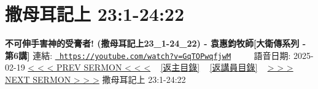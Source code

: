 \documentclass{book}
\begin{document}
\section{撒母耳記上 23:1-24:22}
\label{sec:GqTOPwqfjwM}
\textbf{不可伸手害神的受膏者! (撒母耳記上23\_1-24\_22) - 袁惠鈞牧師[大衛傳系列 - 第6講]}
\newline
\newline
連結: \href{https://youtube.com/watch?v=GqTOPwqfjwM}{\texttt{ https://youtube.com/watch?v=GqTOPwqfjwM}} ~~~~ 語音日期: 2025-02-19 
\newline
\newline
\hyperref[sec:WCt7vYrgwVY]{< < < PREV SERMON < < <}
~
\hyperlink{toc}{[返主目錄]}
~
\hyperref[ch:preacher10]{[返講員目錄]}
~
\hyperref[sec:86NlAlqZbEc]{> > > NEXT SERMON > > >}
\newline
\newline
撒母耳記上 23:1-24:22
\newline
\end{document}
